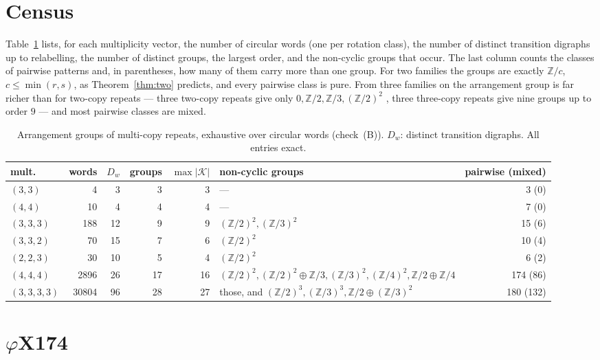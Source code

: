 \documentclass[11pt]{article}
\theoremstyle{plain}
\theoremstyle{definition}
\theoremstyle{remark}
\newcommand{\Z}{\mathbb{Z}}
\newcommand{\K}{\mathcal{K}}
\begin{document}
\section{Census}\label{sec:census}

Table~\ref{tab:census} lists, for each multiplicity vector, the number of circular words
(one per rotation class), the number of distinct transition digraphs up to relabelling,
the number of distinct groups, the largest order, and the non-cyclic groups that occur.
The last column counts the classes of pairwise patterns and, in parentheses, how many of
them carry more than one group. For two families the groups are exactly $\Z/c$,
$c\le\min(r,s)$, as Theorem~\ref{thm:two} predicts, and every pairwise class is pure.
From three families on the arrangement group is far richer than for two-copy repeats
--- three two-copy repeats give only $0,\Z/2,\Z/3,(\Z/2)^{2}$ \cite[Prop.~8]{Bio1},
three three-copy repeats give nine groups up to order $9$ --- and most pairwise classes
are mixed.

\begin{table}[ht]
\centering\footnotesize
\begin{tabular}{lrrrrlr}
\toprule
mult. & words & $D_w$ & groups & $\max|\K|$ & non-cyclic groups & pairwise (mixed)\\
\midrule
$(3,3)$       &     4 &  3 &  3 &  3 & --- & 3 (0)\\
$(4,4)$       &    10 &  4 &  4 &  4 & --- & 7 (0)\\
$(3,3,3)$     &   188 & 12 &  9 &  9 & $(\Z/2)^{2},(\Z/3)^{2}$ & 15 (6)\\
$(3,3,2)$     &    70 & 15 &  7 &  6 & $(\Z/2)^{2}$ & 10 (4)\\
$(2,2,3)$     &    30 & 10 &  5 &  4 & $(\Z/2)^{2}$ & 6 (2)\\
$(4,4,4)$     &  2896 & 26 & 17 & 16 & $(\Z/2)^{2},(\Z/2)^{2}{\oplus}\Z/3,(\Z/3)^{2},(\Z/4)^{2},\Z/2{\oplus}\Z/4$ & 174 (86)\\
$(3,3,3,3)$   & 30804 & 96 & 28 & 27 & those, and $(\Z/2)^{3},(\Z/3)^{3},\Z/2{\oplus}(\Z/3)^{2}$ & 180 (132)\\
\bottomrule
\end{tabular}
\caption{Arrangement groups of multi-copy repeats, exhaustive over circular words
(check~(B)). $D_w$: distinct transition digraphs. All entries exact.}
\label{tab:census}
\end{table}

\section{$\varphi$X174}\label{sec:phix}
\end{document}
